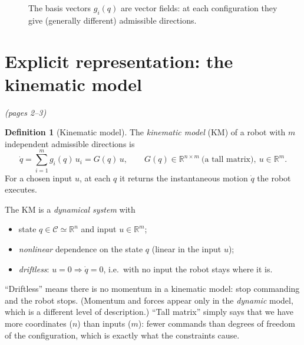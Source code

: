 \documentclass[11pt,a4paper]{article}
\newcommand{\R}{\mathbb{R}}
\newcommand{\dq}{\dot q}
\theoremstyle{definition}
\newtheorem{definition}[theorem]{Definition}
\begin{document}
\begin{figure}[h]
\centering
{}
\caption{The basis vectors $g_i(q)$ are vector fields: at each configuration they give (generally different) admissible directions.}
\end{figure}

\section{Explicit representation: the kinematic model}\emph{(pages 2--3)}

\begin{definition}[Kinematic model]\label{def:km}
The \emph{kinematic model} (KM) of a robot with $m$ independent admissible directions is
\[
\dq=\sum_{i=1}^{m} g_i(q)\,u_i = G(q)\,u,\qquad G(q)\in\R^{n\times m}\ \text{(a tall matrix)},\ u\in\R^m .
\]
For a chosen input $u$, at each $q$ it returns the instantaneous motion $\dq$ the robot executes.
\end{definition}

The KM is a \emph{dynamical system} with
\begin{itemize}[nosep]
\item state $q\in\mathcal{C}\simeq\R^n$ and input $u\in\R^m$;
\item \emph{nonlinear} dependence on the state $q$ (linear in the input $u$);
\item \emph{driftless}: $u=0\Rightarrow \dq=0$, i.e.\ with no input the robot stays where it is.
\end{itemize}

\begin{intuition}
``Driftless'' means there is no momentum in a kinematic model: stop commanding and the robot stops. (Momentum and forces appear only in the \emph{dynamic} model, which is a different level of description.) ``Tall matrix'' simply says that we have more coordinates ($n$) than inputs ($m$): fewer commands than degrees of freedom of the configuration, which is exactly what the constraints cause.
\end{intuition}
\end{document}
